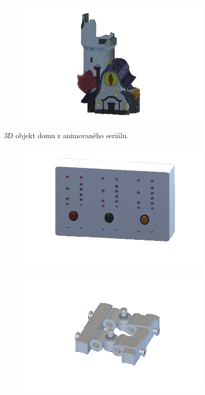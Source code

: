 \documentclass[12pt, a4paper,
twoside,        %
openright
]{report}
\begin{document}
\begin{figure}[h!] \centering
	\begin{subfigure}[h]{0.63\textwidth}
		\includegraphics[width=\textwidth]{image/house.png} 
	\end{subfigure}
	\caption[3D objekt domu]{3D objekt domu z animovaného seriálu.}
	\label{fig:dum}
	\begin{subfigure}[h]{0.63\textwidth}
		\includegraphics[width=\textwidth]{image/modul.png}
	\end{subfigure}
	\caption[3D objekt modulu s vypínači]{3D objekt modulu s vypínači.}
	\label{fig:modul}
	\begin{subfigure}[h]{0.5\textwidth}
		\includegraphics[width=\textwidth]{image/skrtic.png} 

\end{subfigure}
\end{figure}
\end{document}

